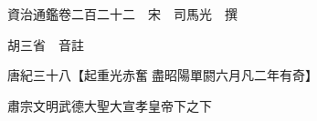 










 


 
 


 

  
  
  
  
  





  
  
  
  
  
 
  

  

  
  
  



  

 
 

  
   




  

  
  


  　　資治通鑑卷二百二十二　宋　司馬光　撰

　　胡三省　音註

　　唐紀三十八【起重光赤奮盡昭陽單閼六月凡二年有奇】

　　肅宗文明武德大聖大宣孝皇帝下之下

